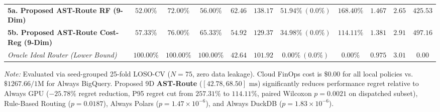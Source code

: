 \documentclass[10pt,a4paper]{article}
\begin{document}
\begin{table}[t!]
{\begin{tabular}{@{}lcccccccccc@{}}
\textbf{5a. Proposed AST-Route RF (9-Dim)} & $52.00\%$ & $72.00\%$ & $56.00\%$ & $62.46$ & $138.17$ & $51.94\%\ (0.0\%)$ & $168.40\%$ & $1.467$ & $2.65$ & $425.53$ \\
\textbf{5b. Proposed AST-Route Cost-Reg (9-Dim)} & $\mathbf{57.33\%}$ & $\mathbf{76.00\%}$ & $\mathbf{65.33\%}$ & $\mathbf{54.92}$ & $\mathbf{129.37}$ & $\mathbf{34.98\%\ (0.0\%)}$ & $\mathbf{114.11\%}$ & $\mathbf{1.381}$ & $2.91$ & $497.16$ \\
\midrule
\textit{Oracle Ideal Router (Lower Bound)} & $100.00\%$ & $100.00\%$ & $100.00\%$ & $42.64$ & $101.92$ & $0.00\%\ (0.0\%)$ & $0.00\%$ & $0.975$ & $3.01$ & $0.00$ \\
\bottomrule
\end{tabular}%
}
\vspace{2pt}
\parbox{\textwidth}{\scriptsize \textit{Note:} Evaluated via seed-grouped 25-fold LOSO-CV ($N=75$, zero data leakage). Cloud FinOps cost is $\$0.00$ for all local policies vs. $\$1267.66/\text{1M}$ for Always BigQuery. Proposed 9D \textbf{AST-Route} ($[42.78, 68.50]\text{ ms}$) significantly reduces performance regret relative to Always GPU ($-25.78\%$ regret reduction, P95 regret cut from $257.31\%$ to $114.11\%$, paired Wilcoxon $p = 0.0021$ on dispatched subset), Rule-Based Routing ($p = 0.0187$), Always Polars ($p = 1.47 \times 10^{-6}$), and Always DuckDB ($p = 1.83 \times 10^{-6}$).}
\end{table}
\end{document}
